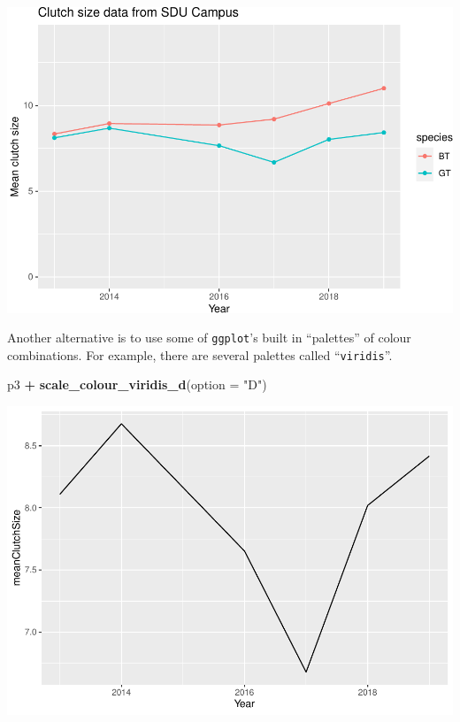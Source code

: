 \documentclass[
  a4paperpaper,
]{book}
\newenvironment{Shaded}{\begin{snugshade}}{\end{snugshade}}
\newcommand{\DataTypeTok}[1]{\textcolor[rgb]{0.13,0.29,0.53}{#1}}
\newcommand{\KeywordTok}[1]{\textcolor[rgb]{0.13,0.29,0.53}{\textbf{#1}}}
\newcommand{\NormalTok}[1]{#1}
\newcommand{\OperatorTok}[1]{\textcolor[rgb]{0.81,0.36,0.00}{\textbf{#1}}}
\newcommand{\StringTok}[1]{\textcolor[rgb]{0.31,0.60,0.02}{#1}}
\begin{document}
\begin{center}\includegraphics{BB852_files/figure-latex/unnamed-chunk-118-1} \end{center}

Another alternative is to use some of \texttt{ggplot}'s built in ``palettes'' of colour combinations. For example, there are several palettes called ``\texttt{viridis}''.

\begin{Shaded}
\begin{Highlighting}[]
\NormalTok{p3 }\OperatorTok{+}\StringTok{ }
\StringTok{  }\KeywordTok{scale\_colour\_viridis\_d}\NormalTok{(}\DataTypeTok{option =} \StringTok{"D"}\NormalTok{)}
\end{Highlighting}
\end{Shaded}

\begin{center}\includegraphics{BB852_files/figure-latex/unnamed-chunk-119-1} \end{center}
\end{document}
